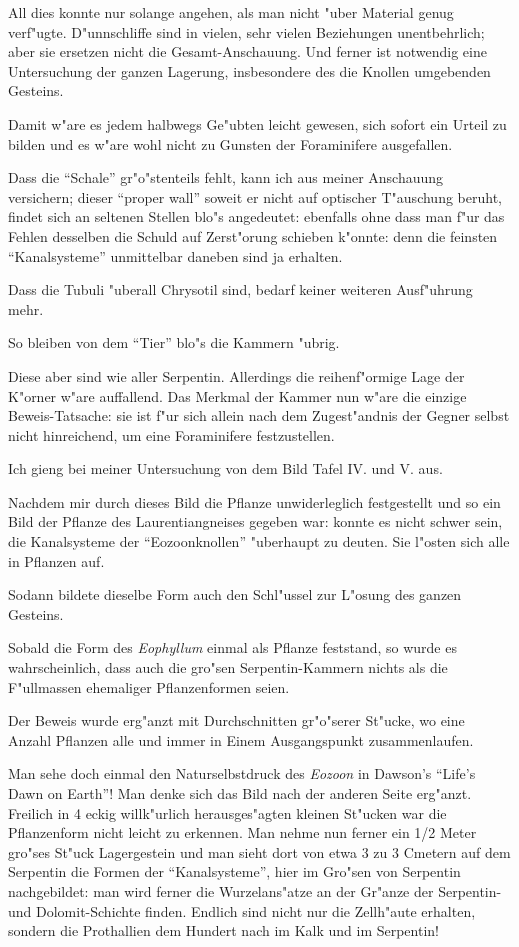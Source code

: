\documentclass[a4paper, 11pt, oneside, german]{article}
\begin{document}
All dies konnte nur solange angehen, als man nicht "uber Material genug verf"ugte. D"unnschliffe sind in vielen, sehr vielen Beziehungen unentbehrlich; aber sie ersetzen nicht die Gesamt-Anschauung. Und ferner ist notwendig eine Untersuchung der ganzen Lagerung, insbesondere des die Knollen umgebenden Gesteins.

Damit w"are es jedem halbwegs Ge"ubten leicht gewesen, sich sofort ein Urteil zu bilden und es w"are wohl nicht zu Gunsten der Foraminifere ausgefallen.

Dass die "`Schale"' gr"o"stenteils fehlt, kann ich aus meiner Anschauung versichern; dieser "`proper wall"' soweit er nicht auf optischer T"auschung beruht, findet sich an seltenen Stellen blo"s angedeutet: ebenfalls ohne dass man f"ur das Fehlen desselben die Schuld auf Zerst"orung schieben k"onnte: denn die feinsten "`Kanalsysteme"' unmittelbar daneben sind ja erhalten.

Dass die Tubuli "uberall Chrysotil sind, bedarf keiner weiteren Ausf"uhrung mehr.

So bleiben von dem "`Tier"' blo"s die Kammern "ubrig.

Diese aber sind wie aller Serpentin. Allerdings die reihenf"ormige Lage der K"orner w"are auffallend. Das Merkmal der Kammer nun w"are die einzige Beweis-Tatsache: sie ist f"ur sich allein nach dem Zugest"andnis der Gegner selbst nicht hinreichend, um eine Foraminifere festzustellen.

Ich gieng bei meiner Untersuchung von dem Bild Tafel IV. und V. aus.

Nachdem mir durch dieses Bild die Pflanze unwiderleglich festgestellt und so ein Bild der Pflanze des Laurentiangneises gegeben war: konnte es nicht schwer sein, die Kanalsysteme der "`Eozoonknollen"' "uberhaupt zu deuten. Sie l"osten sich alle in Pflanzen auf.

Sodann bildete dieselbe Form auch den Schl"ussel zur L"osung des ganzen Gesteins.

Sobald die Form des \emph{Eophyllum} einmal als Pflanze feststand, so wurde es wahrscheinlich, dass auch die gro"sen Serpentin-Kammern nichts als die F"ullmassen ehemaliger Pflanzenformen seien.

Der Beweis wurde erg"anzt mit Durchschnitten gr"o"serer St"ucke, wo eine Anzahl Pflanzen alle und immer in Einem Ausgangspunkt zusammenlaufen.

Man sehe doch einmal den Naturselbstdruck des \emph{Eozoon} in Dawson's "`Life's Dawn on Earth"'! Man denke sich das Bild nach der anderen Seite erg"anzt. Freilich in 4 eckig willk"urlich herausges"agten kleinen St"ucken war die Pflanzenform nicht leicht zu erkennen. Man nehme nun ferner ein 1/2 Meter gro"ses St"uck Lagergestein und man sieht dort von etwa 3 zu 3 Cmetern auf dem Serpentin die Formen der "`Kanalsysteme"', hier im Gro"sen von Serpentin nachgebildet: man wird ferner die Wurzelans"atze an der Gr"anze der Serpentin- und Dolomit-Schichte finden. Endlich sind nicht nur die Zellh"aute erhalten, sondern die Prothallien dem Hundert nach im Kalk und im Serpentin!
\end{document}
